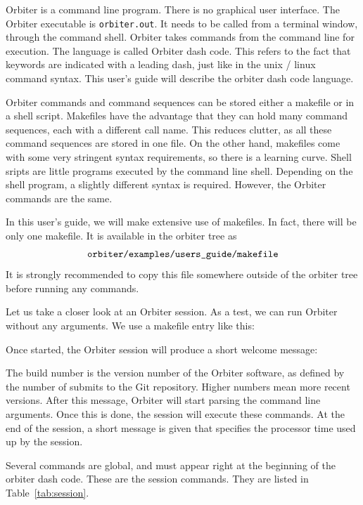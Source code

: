 Orbiter is a command line program. There is no graphical user interface. 
The Orbiter executable is \verb'orbiter.out'. 
It needs to be called from a terminal window, through the command shell. 
Orbiter takes commands from the command line for execution. 
The language is called Orbiter dash code. 
This refers to the fact that 
keywords are indicated with a leading dash, 
just like in the unix / linux command syntax. 
This user's guide will describe the orbiter dash code language.

\bigskip


Orbiter commands and command sequences can be stored 
either a makefile or in a shell script.
Makefiles have the advantage that they can hold many command sequences, 
each with a different call name. 
This reduces clutter, 
as all these command sequences are stored in one file. 
On the other hand, makefiles come with some very stringent syntax requirements, 
so there is a learning curve. 
Shell sripts are little programs executed by the command line shell. 
Depending on the shell program, 
a slightly different syntax is required.
However, the Orbiter commands are the same.

\bigskip


In this user's guide, we will make extensive use of makefiles. 
In fact, there will be only one makefile.
It is available in the orbiter tree as
$$
\verb'orbiter/examples/users_guide/makefile'
$$
It is strongly recommended to copy this file 
somewhere outside of the orbiter tree before running any commands.


\bigskip

Let us take a closer look at an Orbiter session. 
As a test, we can run Orbiter 
without any arguments.
We use a makefile entry like this:


Once started, the Orbiter session 
will produce a short welcome message:

The build number is the version number of the Orbiter software, 
as defined by the number of submits to the Git repository. 
Higher numbers mean more recent versions.
After this message, Orbiter will start parsing the command line arguments. 
Once this is done, the session will execute these commands. 
At the end of the session, a short message 
is given that specifies the processor time used up by the session.

\bigskip

Several commands are global, 
and must appear right at the beginning of the orbiter dash code. 
These are the session commands. 
They are listed in Table~\ref{tab:session}.

